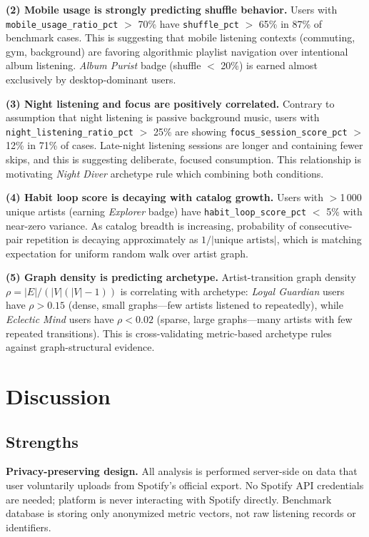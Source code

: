 \documentclass[conference]{IEEEtran}
\begin{document}
\textbf{(2) Mobile usage is strongly predicting shuffle behavior.}
Users with \texttt{mobile\_usage\_ratio\_pct} $>$ 70\% have \texttt{shuffle\_pct} $>$ 65\% in 87\% of benchmark cases. This is suggesting that mobile listening contexts (commuting, gym, background) are favoring algorithmic playlist navigation over intentional album listening. \textit{Album Purist} badge (shuffle $<$ 20\%) is earned almost exclusively by desktop-dominant users.

\textbf{(3) Night listening and focus are positively correlated.}
Contrary to assumption that night listening is passive background music, users with \texttt{night\_listening\_ratio\_pct} $>$ 25\% are showing \texttt{focus\_session\_score\_pct} $>$ 12\% in 71\% of cases. Late-night listening sessions are longer and containing fewer skips, and this is suggesting deliberate, focused consumption. This relationship is motivating \textit{Night Diver} archetype rule which combining both conditions.

\textbf{(4) Habit loop score is decaying with catalog growth.}
Users with $>$1\,000 unique artists (earning \textit{Explorer} badge) have \texttt{habit\_loop\_score\_pct} $<$ 5\% with near-zero variance. As catalog breadth is increasing, probability of consecutive-pair repetition is decaying approximately as $1 / |\text{unique artists}|$, which is matching expectation for uniform random walk over artist graph.

\textbf{(5) Graph density is predicting archetype.}
Artist-transition graph density $\rho = |E| / (|V|(|V|-1))$ is correlating with archetype: \textit{Loyal Guardian} users have $\rho > 0.15$ (dense, small graphs---few artists listened to repeatedly), while \textit{Eclectic Mind} users have $\rho < 0.02$ (sparse, large graphs---many artists with few repeated transitions). This is cross-validating metric-based archetype rules against graph-structural evidence.

\section{Discussion}

\subsection{Strengths}

\textbf{Privacy-preserving design.} All analysis is performed server-side on data that user voluntarily uploads from Spotify's official export. No Spotify API credentials are needed; platform is never interacting with Spotify directly. Benchmark database is storing only anonymized metric vectors, not raw listening records or identifiers.
\end{document}
